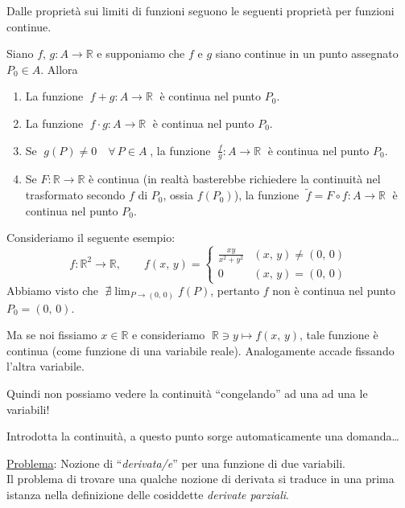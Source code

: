 Dalle proprietà sui limiti di funzioni seguono le seguenti proprietà per funzioni continue.

\begin{proposition}
Siano $f,\,g:A \longrightarrow \mathbb{R}$ e supponiamo che $f$ e $g$ siano continue in un punto assegnato $P_0 \in A$. Allora
\begin{enumerate}[labelindent=\parindent,leftmargin=*,label=\textnormal{(\roman*)},start=1]
\item La funzione $\; f+g:A \longrightarrow \mathbb{R}\; $ è continua nel punto $P_0$.
\item La funzione $\; f \cdot g:A \longrightarrow \mathbb{R}\; $ è continua nel punto $P_0$.
\item Se $\; g(P) \neq 0 \quad \forall \, P \in A \;$, la funzione $\; \displaystyle \frac{f}{g}:A \longrightarrow \mathbb{R}\; $ è continua nel punto $P_0$.
\item Se $F:\mathbb{R} \longrightarrow \mathbb{R}$ è continua (in realtà basterebbe richiedere la continuità nel trasformato secondo $f$ di $P_0$, ossia $f(P_0)$),  la funzione $\; \tilde{f} = F \circ f : A \longrightarrow \mathbb{R}\; $ è continua nel punto $P_0$.
\end{enumerate}
\end{proposition}

\begin{obs}[importante]
Consideriamo il seguente esempio:
$$
f:\mathbb{R}^2 \longrightarrow \mathbb{R}, \qquad
f(x,\,y) =
\begin{cases}
\frac{xy}{x^2+y^2} & (x,\,y) \neq (0,\,0) \\
0 & (x,\,y) = (0,\,0)
\end{cases}
$$
Abbiamo visto che $\; \displaystyle \nexists \lim_{P \rightarrow (0,\,0)} f(P)$, pertanto $f$ non è continua nel punto $P_0 = (0,\,0)$.

Ma se noi fissiamo $x \in \mathbb{R}$ e consideriamo $\; \mathbb{R} \ni y \longmapsto f(x,\,y)$, tale funzione è continua (come funzione di una variabile reale). Analogamente accade fissando l'altra variabile.

Quindi non possiamo vedere la continuità ``congelando'' ad una ad una le variabili!
\end{obs}

Introdotta la continuità, a questo punto sorge automaticamente una domanda\ldots

\underline{Problema}: Nozione di ``\emph{derivata/e}'' per una funzione di due variabili.\\
Il problema di trovare una qualche nozione di derivata si traduce in una prima istanza nella definizione delle cosiddette \emph{derivate parziali}.

